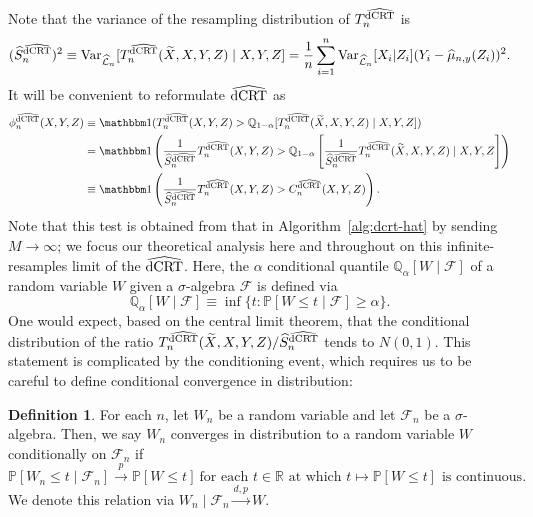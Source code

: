 \documentclass[12pt]{article}
\theoremstyle{definition}
\newtheorem{definition}{Definition}
\theoremstyle{remark}
\newcommand{\V}{\mathrm{Var}}							%
\renewcommand{\P}{\mathbb{P}}							%
\newcommand{\Q}{\mathbb{Q}}								%
\newcommand{\R}{\mathbb{R}}								%
\newcommand{\indicator}{\mathbbm 1}						%
\newcommand{\convp}{\overset p \rightarrow}             %
\newcommand{\srx}{X}									%
\newcommand{\srz}{Z}									%
\newcommand{\srxk}{\widetilde X}						%
\newcommand{\sry}{Y}									%
\newcommand{\lawhat}{\widehat{\mathcal L}}				%
\newcommand{\dCRThat}{\widehat{\textnormal{dCRT}}}		%
\newcommand{\convdp}{\overset {d,p} \longrightarrow}    %
\begin{document}
	Note that the variance of the resampling distribution of $T_n^{\dCRThat}$ is
	\begin{equation}
		(\widehat S_{n}^{\dCRThat})^2 \equiv \V_{\lawhat_n}[T_n^{\dCRThat}(\srxk, \srx, \sry, \srz) \mid \srx, \sry, \srz] = \frac{1}{n}\sum_{i = 1}^n \V_{\lawhat_n}[\srx_i|\srz_i](\sry_i - \widehat \mu_{n,y}(\srz_i))^2.
		\label{eq:conditional-variance-def}
	\end{equation}
	It will be convenient to reformulate $\dCRThat$ as 
	\begin{equation*}
		\begin{split}
			\phi^{\dCRThat}_n(\srx, \sry, \srz) &\equiv \indicator(T_n^{\dCRThat}(\srx, \sry, \srz) > \Q_{1-\alpha}[T_n^{\dCRThat}(\srxk, \srx, \sry, \srz) \mid \srx, \sry, \srz]) \\
			&= \indicator\left(\frac{1}{\widehat S_{n}^{\dCRThat}}T_n^{\dCRThat}(\srx, \sry, \srz) > \Q_{1-\alpha}\left[\frac{1}{\widehat S_{n}^{\dCRThat}}T_n^{\dCRThat}(\srxk, \srx, \sry, \srz) \mid \srx, \sry, \srz\right]\right) \\
			&\equiv \indicator\left(\frac{1}{\widehat S_{n}^{\dCRThat}}T_n^{\dCRThat}(\srx, \sry, \srz) > C^{\dCRThat}_n(\srx, \sry, \srz)\right).
		\end{split}
	\end{equation*}
	Note that this test is obtained from that in Algorithm~\ref{alg:dcrt-hat} by sending $M \rightarrow \infty$; we focus our theoretical analysis here and throughout on this infinite-resamples limit of the $\dCRThat$. Here, the $\alpha$ conditional quantile $\Q_{\alpha}[W \mid \mathcal F]$ of a random variable $W$ given a $\sigma$-algebra $\mathcal F$ is defined via
	\begin{equation}
		\mathbb{Q}_{\alpha}[W \mid \mathcal F] \equiv \inf\{t:\P[W \leq t \mid \mathcal F] \geq \alpha\}.
	\end{equation}
	One would expect, based on the central limit theorem, that the conditional distribution of the ratio $T_n^{\dCRThat}(\srxk, \srx, \sry, \srz)/\widehat S_{n}^{\dCRThat}$ tends to $N(0,1)$. This statement is complicated by the conditioning event, which requires us to be careful to define conditional convergence in distribution:
	
	\begin{definition} \label{def:conditional-convergence-distribution}
		For each $n$, let $W_n$ be a random variable and let $\mathcal F_n$ be a $\sigma$-algebra. Then, we say $W_n$ converges in distribution to a random variable $W$ conditionally on $\mathcal F_n$ if
		\begin{equation}
			\P[W_n \leq t \mid \mathcal F_n] \convp \P[W \leq t] \ \text{for each } t \in \R \text{ at which } t \mapsto \P[W \leq t] \text{ is continuous.}
		\end{equation}
		We denote this relation via $W_n \mid \mathcal F_n \convdp W$.
	\end{definition}
	
\end{document}
